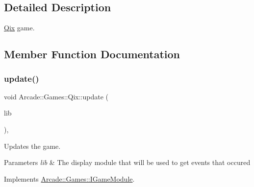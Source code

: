 \subsection{Detailed Description}
\mbox{\hyperlink{classArcade_1_1Games_1_1Qix}{Qix}} game. 

\subsection{Member Function Documentation}
\mbox{\label{classArcade_1_1Games_1_1Qix_aab6bfb0ecf8571da19c4fcbfc9de263e}} 
\subsubsection{\texorpdfstring{update()}{update()}}
{\footnotesize\ttfamily void Arcade\+::\+Games\+::\+Qix\+::update (\begin{DoxyParamCaption}\item[{const \mbox{\hyperlink{classArcade_1_1Display_1_1IDisplayModule}{Arcade\+::\+Display\+::\+I\+Display\+Module}} \&}]{lib }\end{DoxyParamCaption})\hspace{0.3cm}{\ttfamily [final]}, {\ttfamily [virtual]}}



Updates the game. 


\begin{DoxyParams}{Parameters}
{\em lib} & The display module that will be used to get events that occured \\
\hline
\end{DoxyParams}


Implements \mbox{\hyperlink{classArcade_1_1Games_1_1IGameModule_a421d1064fcc112dfc7ea025fc7f88aa7}{Arcade\+::\+Games\+::\+I\+Game\+Module}}.

